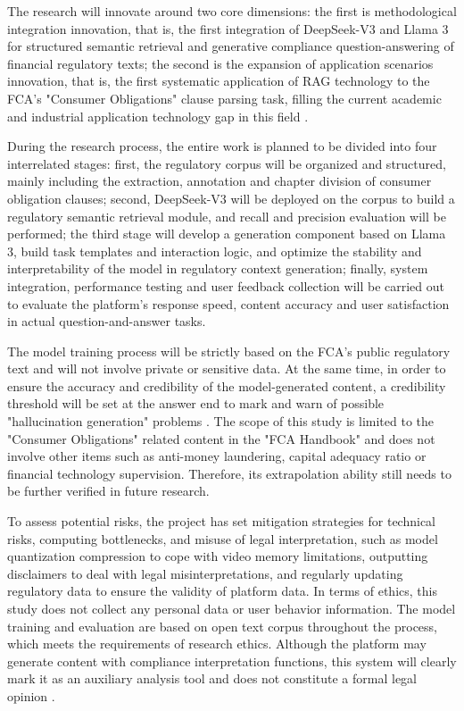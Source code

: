 \documentclass[a4paper,11pt]{article}
\begin{document}
The research will innovate around two core dimensions: the first is methodological integration innovation, that is, the first integration of DeepSeek-V3 and Llama 3 for structured semantic retrieval and generative compliance question-answering of financial regulatory texts; the second is the expansion of application scenarios innovation, that is, the first systematic application of RAG technology to the FCA's "Consumer Obligations" clause parsing task, filling the current academic and industrial application technology gap in this field \cite{zhang2023regtech}.

During the research process, the entire work is planned to be divided into four interrelated stages: first, the regulatory corpus will be organized and structured, mainly including the extraction, annotation and chapter division of consumer obligation clauses; second, DeepSeek-V3 will be deployed on the corpus to build a regulatory semantic retrieval module, and recall and precision evaluation will be performed; the third stage will develop a generation component based on Llama 3, build task templates and interaction logic, and optimize the stability and interpretability of the model in regulatory context generation; finally, system integration, performance testing and user feedback collection will be carried out to evaluate the platform's response speed, content accuracy and user satisfaction in actual question-and-answer tasks.

The model training process will be strictly based on the FCA's public regulatory text and will not involve private or sensitive data. At the same time, in order to ensure the accuracy and credibility of the model-generated content, a credibility threshold will be set at the answer end to mark and warn of possible "hallucination generation" problems \cite{ji2023hallucination}. The scope of this study is limited to the "Consumer Obligations" related content in the "FCA Handbook" and does not involve other items such as anti-money laundering, capital adequacy ratio or financial technology supervision. Therefore, its extrapolation ability still needs to be further verified in future research.

To assess potential risks, the project has set mitigation strategies for technical risks, computing bottlenecks, and misuse of legal interpretation, such as model quantization compression to cope with video memory limitations, outputting disclaimers to deal with legal misinterpretations, and regularly updating regulatory data to ensure the validity of platform data. In terms of ethics, this study does not collect any personal data or user behavior information. The model training and evaluation are based on open text corpus throughout the process, which meets the requirements of research ethics. Although the platform may generate content with compliance interpretation functions, this system will clearly mark it as an auxiliary analysis tool and does not constitute a formal legal opinion \cite{binns2018responsible}.
\end{document}
